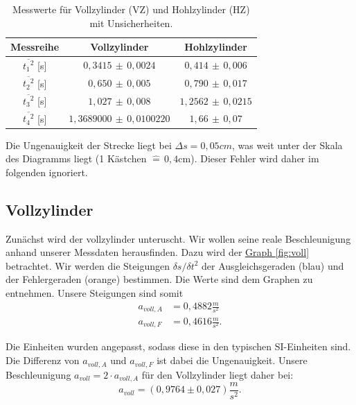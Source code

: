 \begin{table}[!ht]
    \centering
    \hspace*{-2cm}
    \begin{tabular}{c | c | c}
    \toprule
    Messreihe & Vollzylinder & Hohlzylinder \\
    \hline
    $\overline{{t_1}^2}$ [s]& $0,3415 \,\pm\, 0,0024$         & $0,414 \,\pm\, 0,006$ \\
    $\overline{{t_2}^2}$ [s]& $0,650 \,\pm\, 0,005$           & $0,790 \,\pm\, 0,017$ \\
    $\overline{{t_3}^2}$ [s]& $1,027 \,\pm\, 0,008$           & $1,2562 \,\pm\, 0,0215$ \\
    $\overline{{t_4}^2}$ [s]& $1,3689000 \,\pm\, 0,0100220$   & $1,66 \,\pm\, 0,07$ \\
    \bottomrule
    \end{tabular}
    \caption{Messwerte für Vollzylinder (VZ) und Hohlzylinder (HZ) mit Unsicherheiten.}
    \label{tab:mittelwerte}
\end{table}


Die Ungenauigkeit der Strecke liegt bei $\Delta s = 0,05 cm$, was weit unter der Skala des Diagramms liegt (1 Kästchen $\hat = \, 0,4$cm). Dieser Fehler wird daher im folgenden ignoriert.

\subsection*{Vollzylinder}
Zunächst wird der vollzylinder unteruscht. Wir wollen seine reale Beschleunigung anhand unserer Messdaten herausfinden. Dazu wird der \hyperref[fig:voll]{Graph \ref*{fig:voll}} betrachtet. Wir werden die Steigungen $\delta s/\delta t^2$ der Ausgleichsgeraden (blau) und der Fehlergeraden (orange) bestimmen. Die Werte sind dem Graphen zu entnehmen. Unsere Steigungen sind somit
\begin{align}
    a_{voll,A} &= 0,4882 \frac{m}{s^2}\\
    a_{voll,F} &= 0,4616 \frac{m}{s^2}.
\end{align}

Die Einheiten wurden angepasst, sodass diese in den typischen SI-Einheiten sind. Die Differenz von $a_{voll,A}$ und $a_{voll,F}$ ist dabei die Ungenauigkeit. Unsere Beschleunigung $a_{voll} = 2 \cdot a_{voll,A}$ für den Vollzylinder liegt daher bei:
\begin{equation}
    \boxed{
        a_{voll} = (0,9764 \pm 0,027) \frac{m}{s^2}
    }.
\end{equation}

